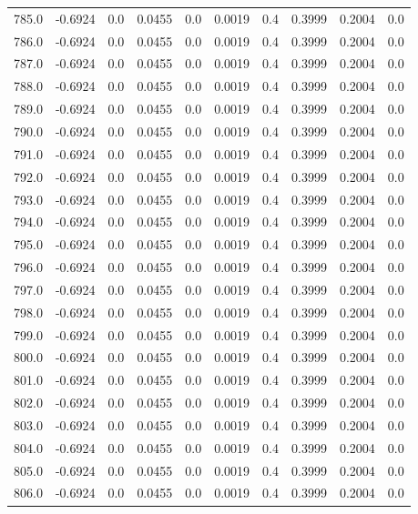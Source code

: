\begin{longtable}{lrrrrrrrrr}
785.0 & -0.6924 & 0.0 & 0.0455 & 0.0 & 0.0019 & 0.4 & 0.3999 & 0.2004 & 0.0 \\
786.0 & -0.6924 & 0.0 & 0.0455 & 0.0 & 0.0019 & 0.4 & 0.3999 & 0.2004 & 0.0 \\
787.0 & -0.6924 & 0.0 & 0.0455 & 0.0 & 0.0019 & 0.4 & 0.3999 & 0.2004 & 0.0 \\
788.0 & -0.6924 & 0.0 & 0.0455 & 0.0 & 0.0019 & 0.4 & 0.3999 & 0.2004 & 0.0 \\
789.0 & -0.6924 & 0.0 & 0.0455 & 0.0 & 0.0019 & 0.4 & 0.3999 & 0.2004 & 0.0 \\
790.0 & -0.6924 & 0.0 & 0.0455 & 0.0 & 0.0019 & 0.4 & 0.3999 & 0.2004 & 0.0 \\
791.0 & -0.6924 & 0.0 & 0.0455 & 0.0 & 0.0019 & 0.4 & 0.3999 & 0.2004 & 0.0 \\
792.0 & -0.6924 & 0.0 & 0.0455 & 0.0 & 0.0019 & 0.4 & 0.3999 & 0.2004 & 0.0 \\
793.0 & -0.6924 & 0.0 & 0.0455 & 0.0 & 0.0019 & 0.4 & 0.3999 & 0.2004 & 0.0 \\
794.0 & -0.6924 & 0.0 & 0.0455 & 0.0 & 0.0019 & 0.4 & 0.3999 & 0.2004 & 0.0 \\
795.0 & -0.6924 & 0.0 & 0.0455 & 0.0 & 0.0019 & 0.4 & 0.3999 & 0.2004 & 0.0 \\
796.0 & -0.6924 & 0.0 & 0.0455 & 0.0 & 0.0019 & 0.4 & 0.3999 & 0.2004 & 0.0 \\
797.0 & -0.6924 & 0.0 & 0.0455 & 0.0 & 0.0019 & 0.4 & 0.3999 & 0.2004 & 0.0 \\
798.0 & -0.6924 & 0.0 & 0.0455 & 0.0 & 0.0019 & 0.4 & 0.3999 & 0.2004 & 0.0 \\
799.0 & -0.6924 & 0.0 & 0.0455 & 0.0 & 0.0019 & 0.4 & 0.3999 & 0.2004 & 0.0 \\
800.0 & -0.6924 & 0.0 & 0.0455 & 0.0 & 0.0019 & 0.4 & 0.3999 & 0.2004 & 0.0 \\
801.0 & -0.6924 & 0.0 & 0.0455 & 0.0 & 0.0019 & 0.4 & 0.3999 & 0.2004 & 0.0 \\
802.0 & -0.6924 & 0.0 & 0.0455 & 0.0 & 0.0019 & 0.4 & 0.3999 & 0.2004 & 0.0 \\
803.0 & -0.6924 & 0.0 & 0.0455 & 0.0 & 0.0019 & 0.4 & 0.3999 & 0.2004 & 0.0 \\
804.0 & -0.6924 & 0.0 & 0.0455 & 0.0 & 0.0019 & 0.4 & 0.3999 & 0.2004 & 0.0 \\
805.0 & -0.6924 & 0.0 & 0.0455 & 0.0 & 0.0019 & 0.4 & 0.3999 & 0.2004 & 0.0 \\
806.0 & -0.6924 & 0.0 & 0.0455 & 0.0 & 0.0019 & 0.4 & 0.3999 & 0.2004 & 0.0 \\

\end{longtable}
